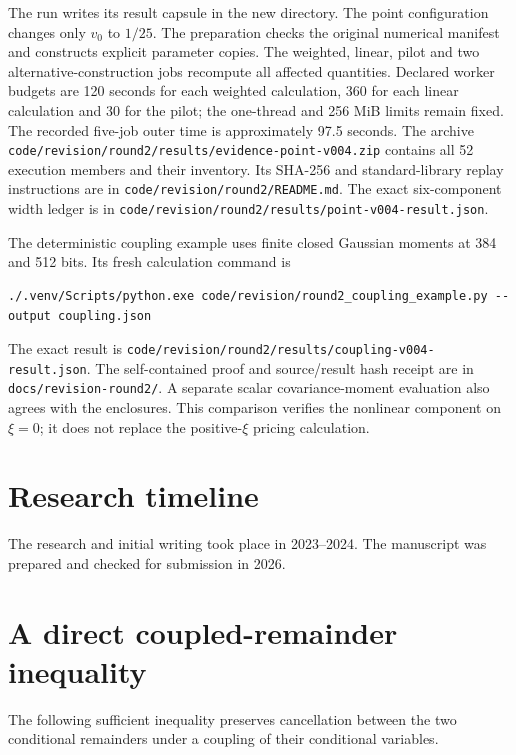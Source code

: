 \documentclass[11pt,a4paper]{article}
\begin{document}
The run writes its result capsule in the new directory. The point configuration
changes only \(v_0\) to \(1/25\). The preparation checks
the original numerical manifest and constructs explicit parameter copies.
The weighted, linear, pilot and two alternative-construction jobs recompute
all affected quantities. Declared worker budgets are 120 seconds for each
weighted calculation, 360 for each linear calculation and 30 for the pilot;
the one-thread and 256 MiB limits remain fixed. The recorded five-job outer time
is approximately 97.5 seconds. The archive
\texttt{code/revision/round2/results/evidence-point-v004.zip} contains all 52
execution members and their inventory. Its SHA-256 and standard-library replay
instructions are in \texttt{code/revision/round2/README.md}. The exact six-component
width ledger is in \texttt{code/revision/round2/results/point-v004-result.json}.

The deterministic coupling example uses finite closed Gaussian moments at
384 and 512 bits. Its fresh calculation command is

\begin{verbatim}
./.venv/Scripts/python.exe code/revision/round2_coupling_example.py --output coupling.json
\end{verbatim}

The exact result is \texttt{code/revision/round2/results/coupling-v004-result.json}.
The self-contained proof and source/result hash receipt are in
\texttt{docs/revision-round2/}. A separate scalar covariance-moment evaluation
also agrees with the enclosures. This comparison verifies the nonlinear
component on \(\xi=0\); it does not replace the positive-\(\xi\) pricing calculation.

\section{Research timeline}

The research and initial writing took place in 2023--2024.
The manuscript was prepared and checked for submission in 2026.

\section{A direct coupled-remainder inequality}

The following sufficient inequality preserves cancellation between the two
conditional remainders under a coupling of their conditional variables.
\end{document}
